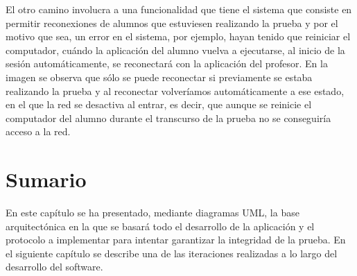 El otro camino involucra a una funcionalidad que tiene el sistema que consiste en permitir reconexiones de alumnos que estuviesen realizando la prueba y por el motivo que sea, un error en el sistema, por ejemplo, hayan tenido que reiniciar el computador, cuándo la aplicación del alumno vuelva a ejecutarse, al inicio de la sesión automáticamente, se reconectará con la aplicación del profesor. En la imagen se observa que sólo se puede reconectar si previamente se estaba realizando la prueba y al reconectar volveríamos automáticamente a ese estado, en el que la red se desactiva al entrar, es decir, que aunque se reinicie el computador del alumno durante el transcurso de la prueba no se conseguiría acceso a la red.
\newline




\section{Sumario}

En este capítulo se ha presentado, mediante diagramas UML, la base arquitectónica en la que se basará todo el desarrollo de la aplicación y el protocolo a implementar para intentar garantizar la integridad de la prueba. En el siguiente capítulo se describe una de las iteraciones realizadas a lo largo del desarrollo del software.
